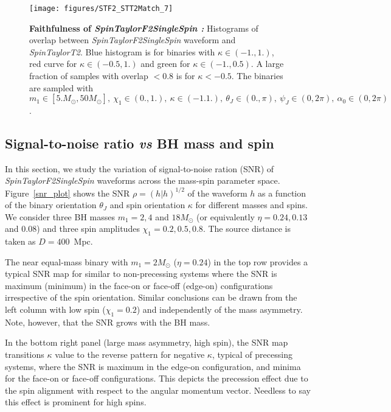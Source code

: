 \documentclass[preprint,onecolumn,,tightenlines,superscriptaddress,showpacs,nofootinbib,eqsecnum,amsfonts,amsmath]{revtex4}
\begin{document}
\begin{figure}
	\centering
	\texttt{[image: figures/STF2\_STT2Match\_7]}
	\caption{{\bf Faithfulness of {\it SpinTaylorF2SingleSpin :}} 
	Histograms of overlap between {\it SpinTaylorF2SingleSpin } waveform and {\it SpinTaylorT2}. Blue histogram is  for binaries with $\kappa \in (-1.,1.)$,   red curve 
	for  $\kappa \in (-0.5,1.)$ and green  for  $\kappa \in (-1.,0.5)$. A large fraction of samples with overlap $< 0.8$ is for $\kappa < -0.5$.
	The binaries are sampled with $m_1 \in [5. M_\odot, 50 M_\odot],~ \chi_1 \in (0.,1.),~ 
	\kappa \in (-1.1.),~\theta_J \in (0.,\pi), ~ \psi_J \in (0, 2 \pi),~\alpha_0 \in (0, 2 \pi)$.}
\label{STF2_STT2_Match}
\end{figure}
\subsection{Signal-to-noise ratio \textit{vs} BH mass and spin}
\label{snr_section}

In this section, we study the variation of signal-to-noise ration (SNR) of {\it SpinTaylorF2SingleSpin} waveforms across the mass-spin parameter space. 
Figure~\ref{snr_plot} shows the SNR $\rho = (h|h)^{1/2}$ of the waveform $h$ as a function of the binary orientation $\theta_J$ and spin orientation $\kappa$ 
for different masses and spins. We consider three BH masses $m_1=2, 4$ and $18 M_\odot$ (or equivalently $\eta = 0.24, 0.13$ and $0.08$) and three spin amplitudes 
$\chi_1 = 0.2, 0.5, 0.8$. The source distance is taken as $D=400$~Mpc.

The near equal-mass binary with $m_1 = 2 M_{\odot}$ ($\eta = 0.24$) in the top row provides a typical SNR map for similar to non-precessing systems where the SNR is maximum (minimum) in the face-on or face-off (edge-on) configurations irrespective of the spin orientation. Similar conclusions can be drawn from the left column with low spin ($\chi_1=0.2$) and independently of the mass asymmetry. Note, however, that the SNR grows with the BH mass.

In the bottom right panel (large mass asymmetry, high spin), the SNR map transitions $\kappa$ value to the reverse pattern for negative $\kappa$, typical of precessing systems, where the SNR is maximum in the edge-on configuration, and minima for the face-on or face-off configurations. This depicts the precession effect due to the spin alignment with respect to the angular momentum vector. Needless to say this effect is prominent for high spins.
\end{document}
